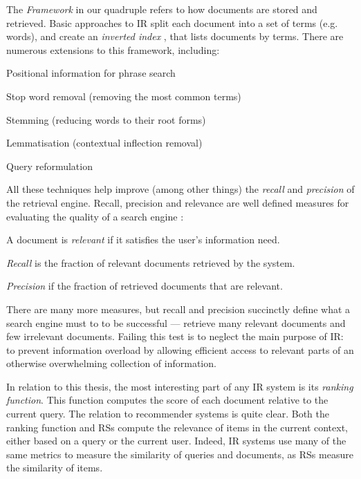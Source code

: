 The \emph{Framework} in our quadruple refers to how documents are stored and retrieved.
Basic approaches to IR split each document into a set of terms (e.g. words),
and create an \emph{inverted index}
\cite[p22]{Manning2008},
that lists documents by terms.
There are numerous extensions to this framework, including: 

\begin{itemize*}
  \item Positional information for phrase search \cite[p39]{Manning2008}
  \item Stop word removal (removing the most common terms) \cite[p27]{Manning2008}
  \item Stemming (reducing words to their root forms) \cite[p32]{Manning2008}
  \item Lemmatisation (contextual inflection removal) \cite[p32]{Manning2008}
  \item Query reformulation \citep[p117]{Baeza-Yates1999}
\end{itemize*}

All these techniques help improve (among other things)
the \emph{recall} and \emph{precision} of the retrieval engine. 
Recall, precision and relevance are well defined measures for evaluating the quality of a search engine \cite[p5]{Manning2008}:

\begin{itemize*}
  \item A document is \emph{relevant} if it satisfies the user's information need.
  \item \emph{Recall} is the fraction of relevant documents retrieved by the system.
  \item \emph{Precision} if the fraction of retrieved documents that are relevant.
\end{itemize*}

There are many more measures, but recall and precision succinctly define what a search engine must to
to be successful --- retrieve many relevant documents and few irrelevant documents.
Failing this test is to neglect the main purpose of IR:
to prevent information overload by allowing efficient access 
to relevant parts of an otherwise overwhelming collection of information.

In relation to this thesis, the most interesting part of any IR system is its \emph{ranking function}.
This function computes the score of each document relative to the current query. 
The relation to recommender systems is quite clear. Both the ranking function and RSs
compute the relevance of items in the current context, either based on a query or the current user.
Indeed, IR systems use many of the same metrics to measure the similarity of queries and documents,
as RSs measure the similarity of items.

